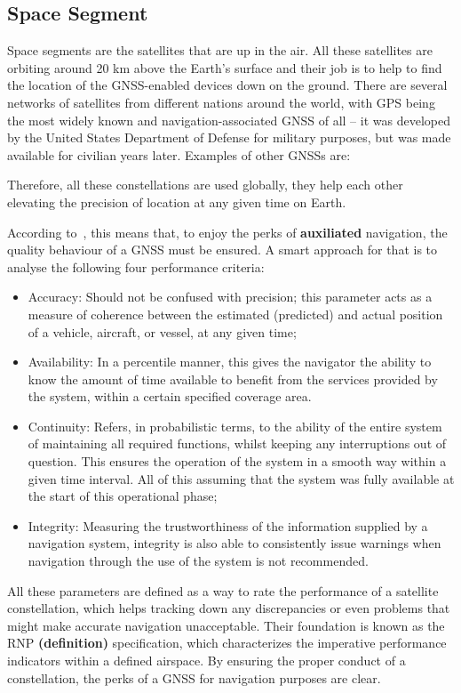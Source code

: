 \subsection{Space Segment}\label{sec:II_gnss_space_seg}

Space segments are the satellites that are up in the air. All these satellites are orbiting around 20 km above the Earth's surface and their job is to help to find the location of the GNSS-enabled devices down on the ground.
There are several networks of satellites from different nations around the world, with GPS being the most widely known and navigation-associated GNSS of all -- it was developed by the United States Department of Defense for military purposes, but was made available for civilian years later. %
Examples of other GNSSs are:

Therefore, all these constellations are used globally, they help each other elevating the precision of location at any given time on Earth.

According to~\cite{fed_rad_plan_2008}, this means that, to enjoy the perks of \textbf{auxiliated} navigation, the quality behaviour of a GNSS must be ensured. A smart approach for that is to analyse the following four performance criteria:

\begin{itemize}
    \item Accuracy: Should not be confused with precision; this parameter acts as a measure of coherence between the estimated (predicted) and actual position of a vehicle, aircraft, or vessel, at any given time;
    \item Availability: In a percentile manner, this gives the navigator the ability to know the amount of time available to benefit from the services provided by the system, within a certain specified coverage area.
    \item Continuity: Refers, in probabilistic terms, to the ability of the entire system of maintaining all required functions, whilst keeping any interruptions out of question. This ensures the operation of the system in a smooth way within a given time interval. All of this assuming that the system was fully available at the start of this operational phase;
    \item Integrity: Measuring the trustworthiness of the information supplied by a navigation system, integrity is also able to consistently issue warnings when navigation through the use of the system is not recommended.
\end{itemize}
All these parameters are defined as a way to rate the performance of a satellite constellation, which helps tracking down any discrepancies or even problems that might make accurate navigation unacceptable.
Their foundation is known as the RNP \textbf{(definition)} specification, which characterizes the imperative performance indicators within a defined airspace. By ensuring the proper conduct of a constellation, the perks of a GNSS for navigation purposes are clear.


